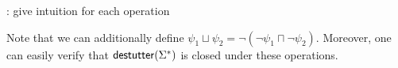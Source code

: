 \TODO: give intuition for each operation

Note that we can additionally define $\psi_1 \sqcup \psi_2 = \lnot (\lnot \psi_1 \sqcap \lnot \psi_2)$.
Moreover, one can easily verify that $\mathsf{destutter}(\Sigma^*)$ is closed under these operations.








%
%
%
